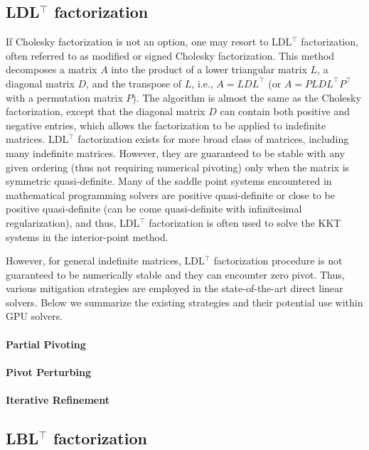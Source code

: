 \documentclass{article}
\begin{document}
\subsection{LDL$^\top$ factorization}
If Cholesky factorization is not an option, one may resort to LDL$^\top$ factorization, often referred to as modified or signed Cholesky factorization.
This method decomposes a matrix $A$ into the product of a lower triangular matrix $L$, a diagonal matrix $D$, and the transpose of $L$, i.e., $A = L D L^\top$ (or $A = P L D L^\top P^\top$ with a permutation matrix $P$).
The algorithm is almost the same as the Cholesky factorization, except that the diagonal matrix $D$ can contain both positive and negative entries, which allows the factorization to be applied to indefinite matrices.
LDL$^\top$ factorization exists for more broad class of matrices, including many indefinite matrices.
However, they are guaranteed to be stable with any given ordering (thus not requiring numerical pivoting) only when the matrix is symmetric quasi-definite.
Many of the saddle point systems encountered in mathematical programming solvers are positive quasi-definite or close to be positive quasi-definite (can be come quasi-definite with infinitesimal regularization), and thus, LDL$^\top$ factorization is often used to solve the KKT systems in the interior-point method.

However, for general indefinite matrices, LDL$^\top$ factorization procedure is not guaranteed to be numerically stable and they can encounter zero pivot.
Thus, various mitigation strategies are employed in the state-of-the-art direct linear solvers.
Below we summarize the existing strategies and their potential use within GPU solvers.
\paragraph{Partial Pivoting}
\paragraph{Pivot Perturbing}
\paragraph{Iterative Refinement}


\subsection{LBL$^\top$ factorization}

\end{document}

